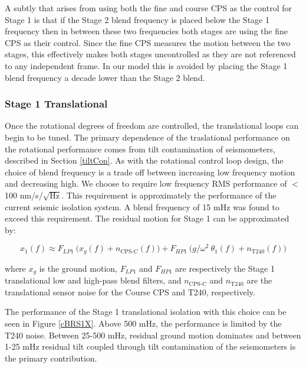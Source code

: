 \documentclass [12pt, proquest]{uwthesis}[2019]
\begin{document}
A subtly that arises from using both the fine and course CPS as the control for Stage 1 is that if the Stage 2 blend frequency is placed below the Stage 1 frequency then in between these two frequencies both stages are using the fine CPS as their control. Since the fine CPS measures the motion between the two stages, this effectively makes both stages uncontrolled as they are not referenced to any independent frame. In our model this is avoided by placing the Stage 1 blend frequency a decade lower than the Stage 2 blend.

\subsubsection{Stage 1 Translational}

Once the rotational degrees of freedom are controlled, the translational loops can begin to be tuned. The primary dependence of the traslational performance on the rotational performance comes from tilt contamination of seismometers, described in Section \ref{tiltCon}. As with the rotational control loop design, the choice of blend frequency is a trade off between increasing low frequency motion and decreasing high. We choose to require low frequency RMS performance of $<$ 100 nm/s$/\sqrt{\text{Hz}}$. This requirement is approximately the performance of the current seismic isolation system. A blend frequency of 15 mHz was found to exceed this requirement. The residual motion for Stage 1 can be approximated by:

\begin{equation}
x_1(f)\approx F_{LP1}\ \big(x_g(f)+n_\text{CPS-C}(f)\big)+F_{HP1}\ \big( g/\omega^2\ \theta_1(f) +n_\text{T240}(f) \big)
\end{equation}

where $x_g$ is the ground motion, $F_{LP1}$ and $F_{HP1}$ are respectively the Stage 1 translational low and high-pass blend filters, and $n_\text{CPS-C}$ and $n_\text{T240}$ are the translational sensor noise for the Course CPS and T240, respectively.

The performance of the Stage 1 translational isolation with this choice can be seen in Figure \ref{cBRS1X}. Above 500 mHz, the performance is limited by the T240 noise. Between 25-500 mHz, residual ground motion dominates and between 1-25 mHz residual tilt coupled through tilt contamination of the seismometers is the primary contribution. 
\end{document}
